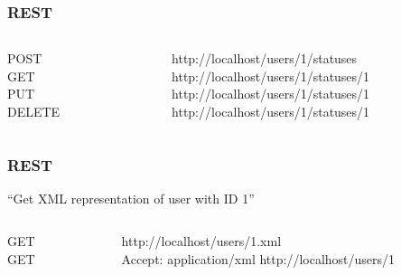 
\begin{frame}
  \frametitle{REST}
  \begin{columns}
    \begin{column}{.3\textwidth}
      \begin{flushright}
      POST\\
      GET\\
      PUT\\
      DELETE
      \end{flushright}
    \end{column}    
    \begin{column}{.7\textwidth}
      \begin{flushleft}
      http://localhost/users/1/statuses\\
      http://localhost/users/1/statuses/1\\
      http://localhost/users/1/statuses/1\\
      http://localhost/users/1/statuses/1\\
      \end{flushleft}
    \end{column}    
  \end{columns}
\end{frame}


\begin{frame}
  \frametitle{REST}
  \begin{center}
  ``Get XML representation of user with ID 1''
  \end{center}
  \begin{columns}
    \begin{column}{.2\textwidth}
      \begin{flushright}
      GET\\
      GET
      \end{flushright}
    \end{column}    
    \begin{column}{.8\textwidth}
      \begin{flushleft}
      http://localhost/users/1\alert{.xml}\\
      \alert{Accept: application/xml} http://localhost/users/1
      \end{flushleft}
    \end{column}    
  \end{columns}
\end{frame}

